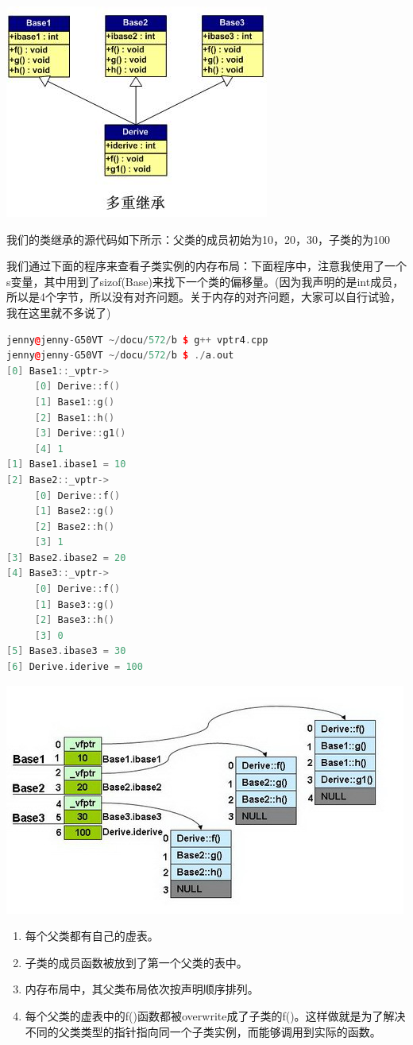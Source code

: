 \documentclass{article}
\begin{document}
\begin{CJK}{UTF8}{gbsn}
\includegraphics{mi02.jpg} 

我们的类继承的源代码如下所示：父类的成员初始为10，20，30，子类的为100

我们通过下面的程序来查看子类实例的内存布局：下面程序中，注意我使用了一个s变量，其中用到了sizof(Base)来找下一个类的偏移量。(因为我声明的是int成员，所以是4个字节，所以没有对齐问题。关于内存的对齐问题，大家可以自行试验，我在这里就不多说了)

\begin{lstlisting}[language=c++]
jenny@jenny-G50VT ~/docu/572/b $ g++ vptr4.cpp
jenny@jenny-G50VT ~/docu/572/b $ ./a.out
[0] Base1::_vptr->
     [0] Derive::f()
     [1] Base1::g()
     [2] Base1::h()
     [3] Derive::g1()
     [4] 1
[1] Base1.ibase1 = 10
[2] Base2::_vptr->
     [0] Derive::f()
     [1] Base2::g()
     [2] Base2::h()
     [3] 1
[3] Base2.ibase2 = 20
[4] Base3::_vptr->
     [0] Derive::f()
     [1] Base3::g()
     [2] Base3::h()
     [3] 0
[5] Base3.ibase3 = 30
[6] Derive.iderive = 100
\end{lstlisting}

\includegraphics{mi03.jpg}

\begin{enumerate}
\item 每个父类都有自己的虚表。
\item 子类的成员函数被放到了第一个父类的表中。
\item 内存布局中，其父类布局依次按声明顺序排列。
\item 每个父类的虚表中的f()函数都被overwrite成了子类的f()。这样做就是为了解决不同的父类类型的指针指向同一个子类实例，而能够调用到实际的函数。
\end{enumerate}



\end{CJK}
\end{document}
